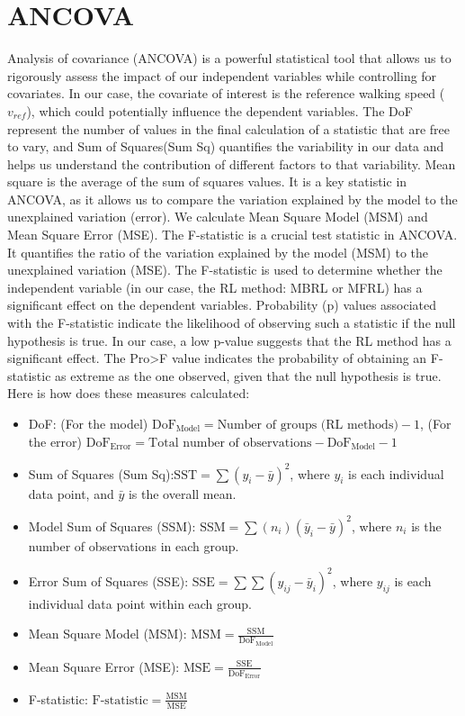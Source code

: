 \section{ANCOVA}
\label{Sec:ANCOVA}
Analysis of covariance (ANCOVA) is a powerful statistical tool that allows us to rigorously assess the impact of our independent variables while controlling for covariates.  In our case, the covariate of interest is the reference walking speed ($v_{ref}$), which could potentially influence the dependent variables. The \ac{DoF}  represent the number of values in the final calculation of a statistic that are free to vary, and Sum of Squares(Sum Sq) quantifies the variability in our data and helps us understand the contribution of different factors to that variability. Mean square is the average of the sum of squares values. It is a key statistic in ANCOVA, as it allows us to compare the variation explained by the model to the unexplained variation (error). We calculate Mean Square Model (MSM) and Mean Square Error (MSE). The F-statistic is a crucial test statistic in ANCOVA. It quantifies the ratio of the variation explained by the model (MSM) to the unexplained variation (MSE). The F-statistic is used to determine whether the independent variable (in our case, the RL method: MBRL or MFRL) has a significant effect on the dependent variables. Probability (p) values associated with the F-statistic indicate the likelihood of observing such a statistic if the null hypothesis is true. In our case, a low p-value suggests that the RL method has a significant effect. The Pro>F value indicates the probability of obtaining an F-statistic as extreme as the one observed, given that the null hypothesis is true. Here is how does these measures calculated:

\begin{itemize}
    \item \ac{DoF}: (For the model) $\text{DoF}_{\text{Model}} = \text{Number of groups (RL methods)} - 1$, (For the error) $\text{DoF}_{\text{Error}} = \text{Total number of observations} - \text{DoF}_{\text{Model}} - 1$
    \item Sum of Squares (Sum Sq):$\text{SST} = \sum(y_i - \bar{y})^2$, where $y_i$ is each individual data point, and $\bar{y}$ is the overall mean.
    \item Model Sum of Squares (SSM): $\text{SSM} = \sum(n_i)(\bar{y}_i - \bar{y})^2$,  where $n_i$ is the number of observations in each group.
    \item Error Sum of Squares (SSE): $\text{SSE} = \sum\sum(y_{ij} - \bar{y}_i)^2$, where $y_{ij}$ is each individual data point within each group.
    \item Mean Square Model (MSM): $\text{MSM} = \frac{\text{SSM}}{\text{DoF}_{\text{Model}}}$
    \item Mean Square Error (MSE): $\text{MSE} = \frac{\text{SSE}}{\text{DoF}_{\text{Error}}}$
    \item F-statistic: $\text{F-statistic} = \frac{\text{MSM}}{\text{MSE}}$
\end{itemize}

